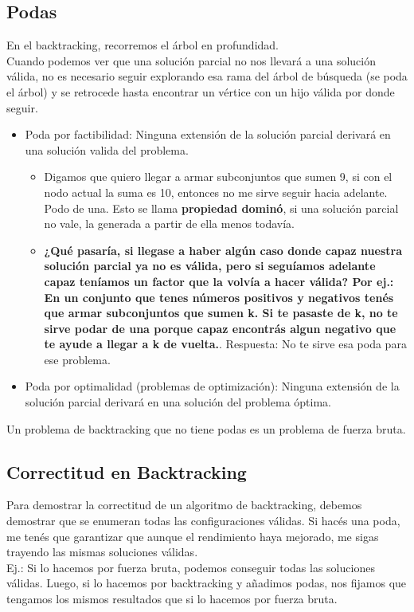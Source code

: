 \documentclass[10pt,a4paper]{article}
\begin{document}
\subsection*{Podas}
En el backtracking, recorremos el árbol en profundidad. \\
Cuando podemos ver que una solución parcial no nos llevará a una solución válida, no es necesario seguir explorando esa rama del árbol de búsqueda (se poda el árbol) y se retrocede hasta encontrar un vértice con un hijo válida por donde seguir. 
\begin{itemize}
    \item Poda por factibilidad: Ninguna extensión de la solución parcial derivará en una solución valida del problema. 
    \begin{itemize}
        \item Digamos que quiero llegar a armar subconjuntos que sumen 9, si con el nodo actual la suma es 10, entonces no me sirve seguir hacia adelante. Podo de una. Esto se llama \textbf{propiedad dominó}, si una solución parcial no vale, la generada a partir de ella menos todavía. 
        \item \textbf{¿Qué pasaría, si llegase a haber algún caso donde capaz nuestra solución parcial ya no es válida, pero si seguíamos adelante capaz teníamos un factor que la volvía a hacer válida? Por ej.: En un conjunto que tenes números positivos y negativos tenés que armar subconjuntos que sumen k. Si te pasaste de k, no te sirve podar de una porque capaz encontrás algun negativo que te ayude a llegar a k de vuelta.}. Respuesta: No te sirve esa poda para ese problema. 
    \end{itemize}
    \item Poda por optimalidad (problemas de optimización): Ninguna extensión de la solución parcial derivará en una solución del problema óptima.
\end{itemize}
Un problema de backtracking que no tiene podas es un problema de fuerza bruta.
\subsection*{Correctitud en Backtracking}
Para demostrar la correctitud de un algoritmo de backtracking, debemos demostrar que se enumeran todas las configuraciones válidas. Si hacés una poda, me tenés que garantizar que aunque el rendimiento haya mejorado, me sigas trayendo las mismas soluciones válidas. \\
Ej.: Si lo hacemos por fuerza bruta, podemos conseguir todas las soluciones válidas. Luego, si lo hacemos por backtracking y añadimos podas, nos fijamos que tengamos los mismos resultados que si lo hacemos por fuerza bruta.
\end{document}
